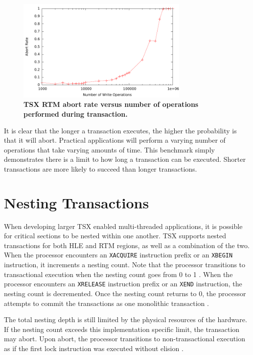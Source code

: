 \documentclass{sig-alternate}
\begin{document}
\begin{figure}
    \centering
    \graphicspath{ {./figures/} }
    \includegraphics[width=0.75\textwidth,keepaspectratio]{trxDuration}
    \caption{\textbf{TSX RTM abort rate versus number of operations performed during
        transaction.}}\label{fig:trx_duration}
\end{figure}

It is clear that the longer a transaction executes, the higher the probability is that it
will abort.  Practical applications will perform a varying number of operations that take
varying amounts of time.  This benchmark simply demonstrates there is a limit to how long
a transaction can be executed.  Shorter transactions are more likely to succeed than
longer transactions.

\section{Nesting Transactions}

When developing larger TSX enabled multi-threaded applications, it is possible for
critical sections to be nested within one another.  TSX supports nested transactions for
both HLE and RTM regions, as well as a combination of the two.  When the processor
encounters an \texttt{XACQUIRE} instruction prefix or an \texttt{XBEGIN} instruction, it
increments a nesting count.  Note that the processor transitions to transactional
execution when the nesting count goes from 0 to 1 \cite{intel_prog_ref}.  When the
processor encounters an \texttt{XRELEASE} instruction prefix or an \texttt{XEND}
instruction, the nesting count is decremented.  Once the nesting count returns to 0, the
processor attempts to commit the transactions as one monolithic transaction
\cite{intel_prog_ref}.

The total nesting depth is still limited by the physical resources of the hardware.  If
the nesting count exceeds this implementation specific limit, the transaction may abort.
Upon abort, the processor transitions to non-transactional execution as if the first lock
instruction was executed without elision \cite{intel_prog_ref}.
\end{document}
